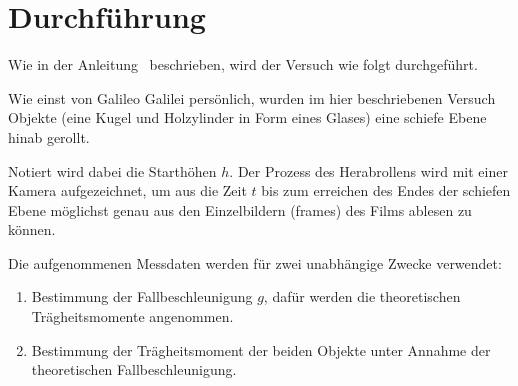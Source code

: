 \section{Durchführung}
\label{sec:Durchführung}

Wie in der Anleitung~\cite{V16516} beschrieben, wird der Versuch wie folgt durchgeführt.

Wie einst von Galileo Galilei \cite[232]{galilei1623} persönlich, wurden im hier beschriebenen Versuch
Objekte (eine Kugel und  Holzylinder in Form eines Glases) eine schiefe Ebene hinab gerollt.

Notiert wird dabei die Starthöhen $h$. Der Prozess des Herabrollens wird mit einer Kamera 
aufgezeichnet, um aus die Zeit $t$ bis zum erreichen des Endes der schiefen Ebene möglichst genau
aus den Einzelbildern (frames) des Films ablesen zu können.

Die aufgenommenen Messdaten werden für zwei unabhängige Zwecke verwendet:

\begin{enumerate}
  \item {Bestimmung der Fallbeschleunigung $g$, dafür werden 
        die theoretischen Trägheitsmomente angenommen.}
  \item {Bestimmung der Trägheitsmoment der beiden Objekte unter Annahme der theoretischen 
        Fallbeschleunigung.}
\end{enumerate}


